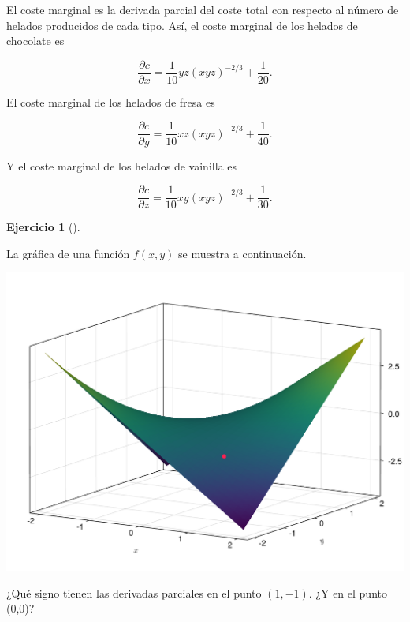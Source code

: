\documentclass[
  a4paper,
]{scrreport}
\theoremstyle{definition}
\newtheorem{exercise}{Ejercicio}[chapter]
\theoremstyle{remark}
\begin{document}
\begin{tcolorbox}[enhanced jigsaw, leftrule=.75mm, colbacktitle=quarto-callout-tip-color!10!white, toprule=.15mm, title=\textcolor{quarto-callout-tip-color}{\faLightbulb}\hspace{0.5em}{Solución}, bottomtitle=1mm, breakable, coltitle=black, colback=white, bottomrule=.15mm, colframe=quarto-callout-tip-color-frame, titlerule=0mm, toptitle=1mm, left=2mm, arc=.35mm, rightrule=.15mm, opacitybacktitle=0.6, opacityback=0]

El coste marginal es la derivada parcial del coste total con respecto al
número de helados producidos de cada tipo. Así, el coste marginal de los
helados de chocolate es

\[
\frac{\partial c}{\partial x} = \frac{1}{10}yz(xyz)^{-2/3} + \frac{1}{20}.
\]

El coste marginal de los helados de fresa es

\[
\frac{\partial c}{\partial y} = \frac{1}{10}xz(xyz)^{-2/3} + \frac{1}{40}.
\]

Y el coste marginal de los helados de vainilla es

\[
\frac{\partial c}{\partial z} = \frac{1}{10}xy(xyz)^{-2/3} + \frac{1}{30}.
\]

\end{tcolorbox}

\begin{exercise}[]\protect\hypertarget{exr-interpretacion-derivadas-parciales-superficie}{}\label{exr-interpretacion-derivadas-parciales-superficie}

La gráfica de una función \(f(x,y)\) se muestra a continuación.

\includegraphics{img/derivadas-funciones-varias-variables/interpretacion-derivadas-parciales-superficie.pdf}

¿Qué signo tienen las derivadas parciales en el punto \((1,-1)\). ¿Y en
el punto (0,0)?

\end{exercise}
\end{document}
